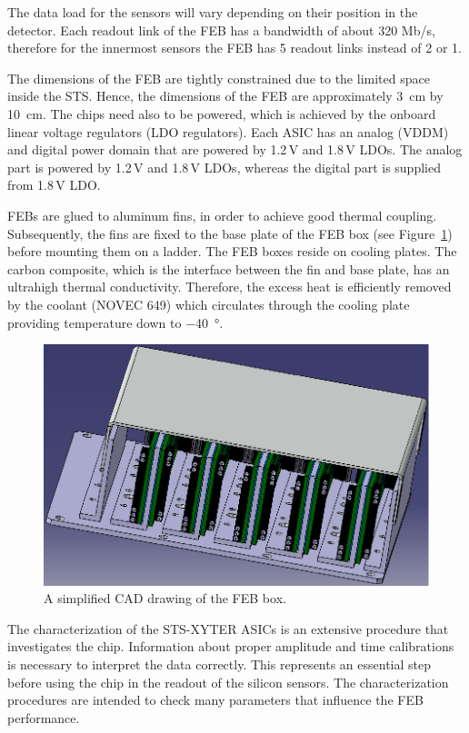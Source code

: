 The data load for the sensors will vary depending on their position in the detector. Each readout link of the \gls{FEB} has a bandwidth of about 320 Mb/s, therefore for the innermost sensors the \gls{FEB} has 5 readout links instead of 2 or 1. 

The dimensions of the \gls{FEB} are tightly constrained due to the limited space inside the \gls{STS}. Hence, the dimensions of the \gls{FEB} are approximately \SI{3}{\centi\metre} by \SI{10}{\centi\metre}. The chips need also to be powered, which is achieved by the onboard linear voltage regulators (\gls{LDO} regulators). Each \gls{ASIC} has an analog (VDDM) and digital power domain that are powered by 1.2\,V and 1.8\,V \glspl{LDO}. The analog part is powered by 1.2\,V and 1.8\,V \glspl{LDO}, whereas the digital part is supplied from 1.8\,V \gls{LDO}.

\glspl{FEB} are glued to aluminum fins, in order to achieve good thermal coupling. Subsequently, the fins are fixed to the base plate of the \gls{FEB} box (see Figure~\ref{feb_box}) before mounting them on a ladder. The \gls{FEB} boxes reside on cooling plates. The carbon composite, which is the interface between the fin and base plate, has an ultrahigh thermal conductivity. Therefore, the excess heat is efficiently removed by the coolant (NOVEC 649) which circulates through the cooling plate providing temperature down to \SI{-40}{\degree}. 

\begin{figure}[!h]
\centering
\includegraphics[width=0.45\columnwidth]{Chapter2/images/feb_box.png}
\caption{A simplified CAD drawing of the \gls{FEB} box.}
\label{feb_box}
\end{figure}


The characterization of the STS-XYTER ASICs is an extensive procedure that investigates the chip. Information about proper amplitude and time calibrations is necessary to interpret the data correctly. This represents an essential step before using the chip in the readout of the silicon sensors. The characterization procedures are intended to
check many parameters that influence the \gls{FEB} performance. 


